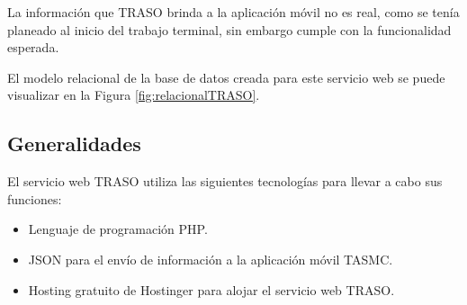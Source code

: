 La información que TRASO brinda a la aplicación móvil no es real, como se tenía planeado al inicio del trabajo terminal, sin embargo cumple con la funcionalidad esperada. 

El modelo relacional de la base de datos creada para este servicio web se puede visualizar en la Figura \ref{fig:relacionalTRASO}.

\subsection{Generalidades}
El servicio web TRASO utiliza las siguientes tecnologías para llevar a cabo sus funciones:
\begin{itemize}
 \item Lenguaje de programación PHP.
 \item JSON para el envío de información a la aplicación móvil TASMC.
 \item Hosting gratuito de Hostinger para alojar el servicio web TRASO.
\end{itemize}
\clearpage